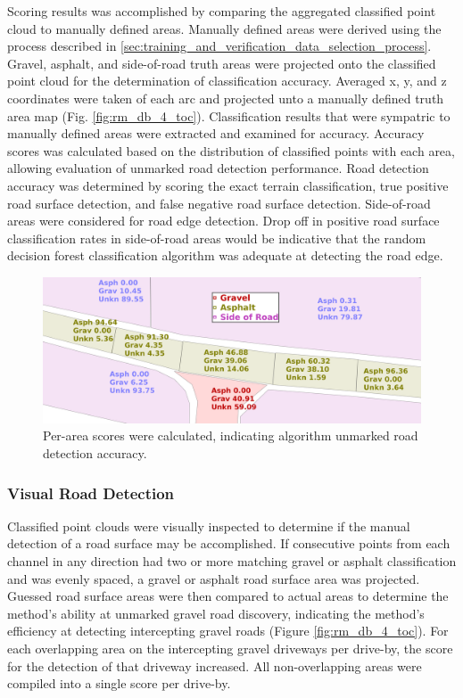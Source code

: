 \documentclass[numbered,pdftex]{ohio-etd}
\begin{document}
{{{{{				{Scoring results was accomplished by comparing the aggregated classified point cloud to manually defined areas. Manually defined areas were derived using the process described in \ref{sec:training_and_verification_data_selection_process}. Gravel, asphalt, and side-of-road truth areas were projected onto the classified point cloud for the determination of classification accuracy. Averaged x, y, and z coordinates were taken of each arc and projected unto a manually defined truth area map (Fig. \ref{fig:rm_db_4_toc}). Classification results that were sympatric to manually defined areas were extracted and examined for accuracy. Accuracy scores was calculated based on the distribution of classified points with each area, allowing evaluation of unmarked road detection performance. Road detection accuracy was determined by scoring the exact terrain classification, true positive road surface detection, and false negative road surface detection. Side-of-road areas were considered for road edge detection. Drop off in positive road surface classification rates in side-of-road areas would be indicative that the random decision forest classification algorithm was adequate at detecting the road edge.}
				

				\begin{figure}[H]
					\centering
					\includegraphics[width=0.75\linewidth]{Defense_Images/rm_db_1_area_score}
					\caption[Area Scores]{Per-area scores were calculated, indicating algorithm unmarked road detection accuracy. }
					\label{fig:prepostadjust}
				\end{figure}

				
			}
		
			\subsubsection{Visual Road Detection}\label{sec:manual_road_detection}{
			
				{Classified point clouds were visually inspected to determine if the manual detection of a road surface may be accomplished. If consecutive points from each channel in any direction had two or more matching gravel or asphalt classification and was evenly spaced, a gravel or asphalt road surface area was projected. Guessed road surface areas were then compared to actual areas to determine the method's ability at unmarked gravel road discovery, indicating the method's efficiency at detecting intercepting gravel roads (Figure \ref{fig:rm_db_4_toc}). For each overlapping area on the intercepting gravel driveways per drive-by, the score for the detection of that driveway increased. All non-overlapping areas were compiled into a single score per drive-by.}	
				
}}}}}
\end{document}
